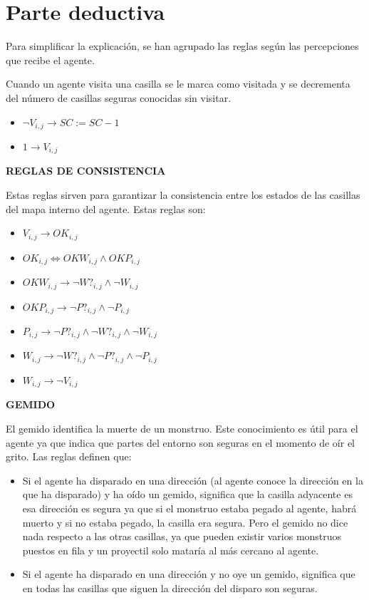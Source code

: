 \section{Parte deductiva}

Para simplificar la explicación, se han agrupado las reglas según las percepciones que recibe el agente.

Cuando un agente visita una casilla se le marca como visitada y se decrementa del número de casillas seguras conocidas sin visitar.

\begin{itemize}
    \item $\neg V_{i, j} \longrightarrow SC := SC - 1$
    \item $1 \longrightarrow V_{i, j}$
\end{itemize}

\centerline{\textbf{REGLAS DE CONSISTENCIA}}

Estas reglas sirven para garantizar la consistencia entre los estados de las casillas del mapa interno del agente. Estas reglas son:

\begin{itemize}
    \item $V_{i, j} \longrightarrow OK_{i, j}$
    \item $OK_{i, j} \iff OKW_{i, j} \land OKP_{i, j} $
    \item $OKW_{i, j} \longrightarrow \neg W?_{i, j} \land \neg W_{i, j} $
    \item $OKP_{i, j} \longrightarrow \neg P?_{i, j} \land \neg P_{i, j} $
    \item $P_{i, j} \longrightarrow \neg P?_{i, j} \land \neg W?_{i, j} \land \neg W_{i, j}$
    \item $W_{i, j} \longrightarrow \neg W?_{i, j} \land \neg P?_{i, j} \land \neg P_{i, j}$
    \item $W_{i, j} \longrightarrow \neg V_{i, j}$
\end{itemize}

\centerline{\textbf{GEMIDO}}

El gemido identifica la muerte de un monstruo. Este conocimiento es útil para el agente ya que indica que partes del entorno son seguras en el momento de oír el grito. Las reglas definen que:

\begin{itemize}
    \item Si el agente ha disparado en una dirección (al agente conoce la dirección en la que ha disparado) y ha oído un gemido, significa que la casilla adyacente es esa dirección es segura ya que si el monstruo estaba pegado al agente, habrá muerto y si no estaba pegado, la casilla era segura. Pero el gemido no dice nada respecto a las otras casillas, ya que pueden existir varios monstruos puestos en fila y un proyectil solo mataría al más cercano al agente.
    \item Si el agente ha disparado en una dirección y no oye un gemido, significa que en todas las casillas que siguen la dirección del disparo son seguras.
\end{itemize}

